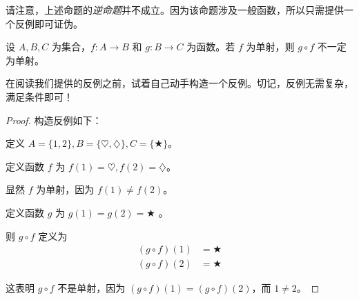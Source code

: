 请注意，上述命题的\emph{逆命题}并不成立。因为该命题涉及一般函数，所以只需提供一个反例即可证伪。

\begin{proposition}
    设 $A, B, C$ 为集合，$f : A \to B$ 和 $g : B \to C$ 为函数。若 $f$ 为单射，则 $g \circ f$ 不一定为单射。
\end{proposition}

在阅读我们提供的反例之前，试着自己动手构造一个反例。切记，反例无需复杂，满足条件即可！

\begin{proof}
    构造反例如下：

    定义 $A = \{1, 2\}, B = \{\heartsuit, \diamondsuit\}, C = \{\bigstar\}$。

    定义函数 $f$ 为 $f(1) = \heartsuit, f(2) = \diamondsuit$。

    显然 $f$ 为单射，因为 $f(1) \ne f(2)$。

    定义函数 $g$ 为 $g(1) = g(2) = \bigstar$ 。

    则 $g \circ f$ 定义为 
    \begin{align*}
        (g \circ f)(1) &= \bigstar \\
        (g \circ f)(2) &= \bigstar
    \end{align*}

    这表明 $g \circ f$ 不是单射，因为 $(g \circ f)(1) = (g \circ f)(2)$，而 $1 \ne 2$。
\end{proof}

\clearpage